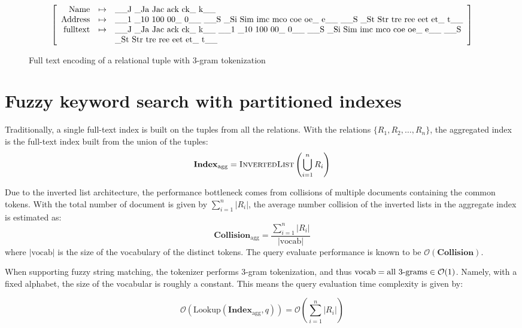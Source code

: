 \documentclass[conference]{IEEEtran}
\begin{document}
\begin{figure}[t]
	\label{fig:encoding}
$$
\left[\begin{array}{rcl}
\mathrm{Name} & \mapsto & \makebox{\_\_J \_Ja Jac ack ck\_ k\_\_} \\
\mathrm{Address} & \mapsto & \makebox{\_\_1 \_10 100 00\_ 0\_\_ \_\_S \_Si Sim imc mco coe oe\_ e\_\_ \_\_S \_St Str tre ree eet et\_ t\_\_} \\
\mathrm{fulltext} & \mapsto & \makebox{\_\_J \_Ja Jac ack ck\_ k\_\_ \_\_1 \_10 100 00\_ 0\_\_ \_\_S \_Si Sim imc mco coe oe\_ e\_\_ \_\_S} \\ 
 & & \makebox{\_St Str tre ree eet et\_ t\_\_}\\
\end{array}\right]
$$
	\caption{Full text encoding of a relational tuple with 3-gram tokenization}
\end{figure}

\section{Fuzzy keyword search with partitioned indexes}

Traditionally, a single full-text index is built on the tuples from all the relations. With the relations $\{R_1, R_2, \dots, R_n\}$, the aggregated index
is the full-text index built from the union of the tuples:
$$\mathbf{Index}_\mathrm{agg} = \textsc{InvertedList}\left(\bigcup_{i=1}^n R_i\right) $$

Due to the inverted list architecture, the performance bottleneck comes
from collisions of multiple documents containing the common tokens.  With the total number of document is given by $\sum_{i=1}^n |R_i|$, the average
number collision of the inverted lists in the aggregate index is estimated as:
$$
\mathbf{Collision}_\mathrm{agg} = \frac{
  \sum_{i=1}^n |R_i|
}{
  |\mathrm{vocab}|
}
$$
where $|\mathrm{vocab}|$ is the size of the vocabulary of the distinct tokens.
The query evaluate performance is known to be $\mathcal{O}(\mathbf{Collision})$.

When supporting fuzzy string matching, the tokenizer performs 3-gram tokenization,
and thus $\mathrm{vocab} = \makebox{all 3-grams} \in\mathcal{O}(1)$.  Namely,
with a fixed alphabet, the size of the vocabular is roughly a constant.  This means
the query evaluation time complexity is given by:

$$
\mathcal{O}(\mathrm{Lookup}(\mathbf{Index}_\mathrm{agg}, q)) = \mathcal{O}\left(\sum_{i=1}^n |R_i|\right)
$$
\end{document}
